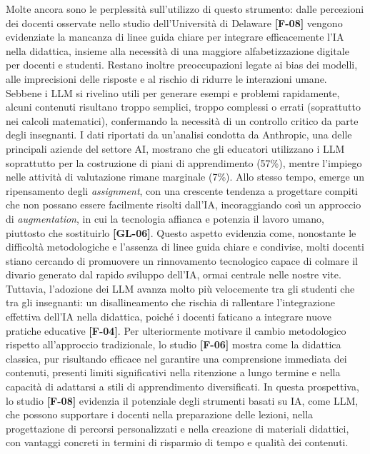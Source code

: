 \documentclass[a4paper,9pt]{article}
\begin{document}
Molte ancora sono le perplessità sull'utilizzo di questo strumento: dalle percezioni dei docenti osservate nello studio dell'Università di Delaware \textbf{[F-08]} vengono evidenziate la mancanza di linee guida chiare per integrare efficacemente l’IA nella didattica, insieme alla necessità di una maggiore alfabetizzazione digitale per docenti e studenti. Restano inoltre preoccupazioni legate ai bias dei modelli, alle imprecisioni delle risposte e al rischio di ridurre le interazioni umane. Sebbene i LLM si rivelino utili per generare esempi e problemi rapidamente, alcuni contenuti risultano troppo semplici, troppo complessi o errati (soprattutto nei calcoli matematici), confermando la necessità di un controllo critico da parte degli insegnanti. I dati riportati da un’analisi condotta da Anthropic, una delle principali aziende del settore AI, mostrano che gli educatori utilizzano i LLM soprattutto per la costruzione di piani di apprendimento (57\%), mentre l’impiego nelle attività di valutazione rimane marginale (7\%). Allo stesso tempo, emerge un ripensamento degli \emph{assignment}, con una crescente tendenza a progettare compiti che non possano essere facilmente risolti dall’IA, incoraggiando così un approccio di \emph{augmentation}, in cui la tecnologia affianca e potenzia il lavoro umano, piuttosto che sostituirlo \textbf{[GL-06]}. Questo aspetto evidenzia come, nonostante le difficoltà metodologiche e l’assenza di linee guida chiare e condivise, molti docenti stiano cercando di promuovere un rinnovamento tecnologico capace di colmare il divario generato dal rapido sviluppo dell’IA, ormai centrale nelle nostre vite. Tuttavia, l’adozione dei LLM avanza molto più velocemente tra gli studenti che tra gli insegnanti: un disallineamento che rischia di rallentare l’integrazione effettiva dell’IA nella didattica, poiché i docenti faticano a integrare nuove pratiche educative \textbf{[F-04]}. Per ulteriormente motivare il cambio metodologico rispetto all’approccio tradizionale, lo studio \textbf{[F-06]} mostra come la didattica classica, pur risultando efficace nel garantire una comprensione immediata dei contenuti, presenti limiti significativi nella ritenzione a lungo termine e nella capacità di adattarsi a stili di apprendimento diversificati. In questa prospettiva, lo studio \textbf{[F-08]} evidenzia il potenziale degli strumenti basati su IA, come LLM, che possono supportare i docenti nella preparazione delle lezioni, nella progettazione di percorsi personalizzati e nella creazione di materiali didattici, con vantaggi concreti in termini di risparmio di tempo e qualità dei contenuti. \\
\end{document}
